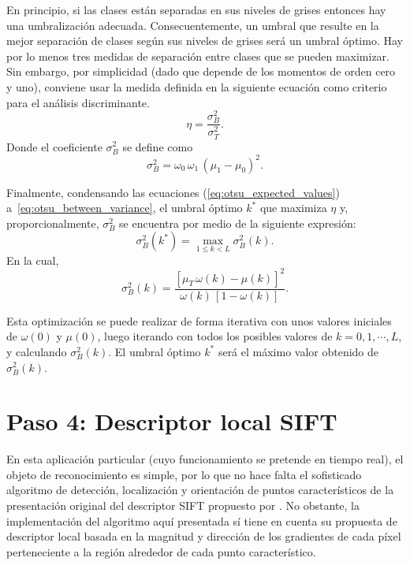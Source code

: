 En principio, si las clases están separadas en sus niveles de grises entonces hay una umbralización adecuada.
Consecuentemente, un umbral que resulte en la mejor separación de clases según sus niveles de grises será un umbral óptimo.
Hay por lo menos tres medidas de separación entre clases que se pueden maximizar.
Sin embargo, por simplicidad (dado que depende de los momentos de orden cero y uno), conviene usar la medida definida en la siguiente ecuación como criterio para el análisis discriminante.
%
\begin{equation}
    \eta = \frac{\sigma_B^2}{\sigma_T^2}. \label{eq:otsu_discriminant_criterion}
\end{equation}
%
Donde el coeficiente $\sigma_B^2$ se define como
%
\begin{equation}
    \sigma_B^2 = \omega_0\,\omega_1\,\left(\mu_1 - \mu_0\right)^2. \label{eq:otsu_between_variance}
\end{equation}

Finalmente, condensando las ecuaciones (\ref{eq:otsu_expected_values}) a~\eqref{eq:otsu_between_variance}, el umbral óptimo $k^*$ que maximiza $\eta$ y, proporcionalmente, $\sigma_B^2$ se encuentra por medio de la siguiente expresión:
%
\begin{equation}
    \sigma_B^2(k^*) = \max_{1 \le k < L} \sigma_B^2(k). \label{eq:otsu_optimum_threshold}
\end{equation}
%
En la cual,
%
\begin{equation}
    \sigma_B^2(k) = \frac{\left[\mu_T\,\omega(k) - \mu(k)\right]^2}
    {\omega(k)\,\left[1 - \omega(k)\right]}. \label{eq:otsu_between_variance4optimize}
\end{equation}

Esta optimización se puede realizar de forma iterativa con unos valores iniciales de $\omega(0)$ y $\mu(0)$, luego iterando con todos los posibles valores de $k = 0, 1, \cdots, L$, y calculando $\sigma_B^2(k)$.
El umbral óptimo $k^*$ será el máximo valor obtenido de $\sigma_B^2(k)$.


\section*{Paso 4: Descriptor local SIFT}
\label{sec:sift_descriptor}
En esta aplicación particular (cuyo funcionamiento se pretende en tiempo real), el objeto de reconocimiento es simple, por lo que no hace falta el sofisticado algoritmo de detección, localización y orientación de puntos característicos de la presentación original del descriptor SIFT propuesto por \citet{Lowe2004}.
No obstante, la implementación del algoritmo aquí presentada sí tiene en cuenta su propuesta de descriptor local basada en la magnitud y dirección de los gradientes de cada píxel perteneciente a la región alrededor de cada punto característico.

